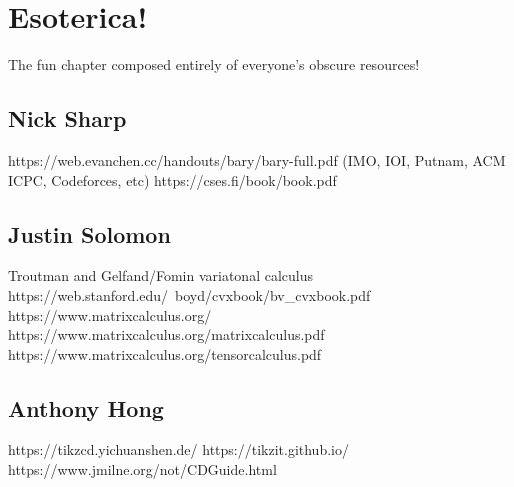 \chapter{Esoterica!}

The fun chapter composed entirely of everyone's obscure resources!

\section*{Nick Sharp}
https://web.evanchen.cc/handouts/bary/bary-full.pdf
(IMO, IOI, Putnam, ACM ICPC, Codeforces, etc)
https://cses.fi/book/book.pdf

\section*{Justin Solomon}
Troutman and Gelfand/Fomin variatonal calculus
https://web.stanford.edu/~boyd/cvxbook/bv\_cvxbook.pdf
https://www.matrixcalculus.org/
https://www.matrixcalculus.org/matrixcalculus.pdf
https://www.matrixcalculus.org/tensorcalculus.pdf

\section*{Anthony Hong}
https://tikzcd.yichuanshen.de/
https://tikzit.github.io/
https://www.jmilne.org/not/CDGuide.html
